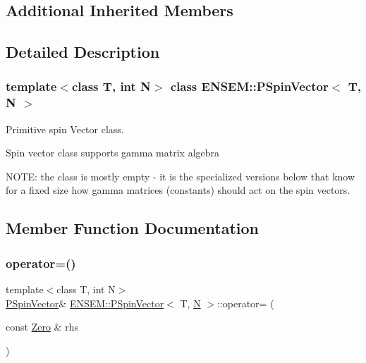 \subsection*{Additional Inherited Members}


\subsection{Detailed Description}
\subsubsection*{template$<$class T, int N$>$\newline
class E\+N\+S\+E\+M\+::\+P\+Spin\+Vector$<$ T, N $>$}

Primitive spin Vector class. 

Spin vector class supports gamma matrix algebra

N\+O\+TE\+: the class is mostly empty -\/ it is the specialized versions below that know for a fixed size how gamma matrices (constants) should act on the spin vectors. 

\subsection{Member Function Documentation}
\mbox{\label{classENSEM_1_1PSpinVector_aff99857da5f6f68093f04c9df5355e84}} 
\subsubsection{\texorpdfstring{operator=()}{operator=()}\hspace{0.1cm}{\footnotesize\ttfamily [1/4]}}
{\footnotesize\ttfamily template$<$class T, int N$>$ \\
\mbox{\hyperlink{classENSEM_1_1PSpinVector}{P\+Spin\+Vector}}\& \mbox{\hyperlink{classENSEM_1_1PSpinVector}{E\+N\+S\+E\+M\+::\+P\+Spin\+Vector}}$<$ T, \mbox{\hyperlink{operator__name__util_8cc_a7722c8ecbb62d99aee7ce68b1752f337}{N}} $>$\+::operator= (\begin{DoxyParamCaption}\item[{const \mbox{\hyperlink{structENSEM_1_1Zero}{Zero}} \&}]{rhs }\end{DoxyParamCaption})\hspace{0.3cm}{\ttfamily [inline]}}



